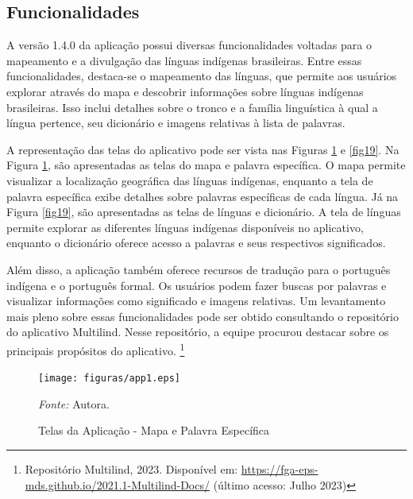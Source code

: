 \subsection{Funcionalidades}
\label{Funcionalidades}
A versão 1.4.0 da aplicação possui diversas funcionalidades voltadas para o mapeamento e a divulgação das línguas indígenas brasileiras. Entre essas funcionalidades, destaca-se o mapeamento das línguas, que permite aos usuários 
explorar através do mapa e descobrir informações sobre línguas indígenas brasileiras. Isso inclui detalhes sobre o tronco e a família linguística à qual a língua pertence, seu dicionário e imagens relativas à lista de palavras.


A representação das telas do aplicativo pode ser vista nas Figuras \ref{fig18} e \ref{fig19}. Na Figura \ref{fig18}, são apresentadas as telas do mapa e palavra específica. O mapa permite visualizar a localização geográfica das 
línguas indígenas, enquanto a tela de palavra específica exibe detalhes sobre palavras específicas de cada língua. Já na Figura \ref{fig19}, são apresentadas as telas de línguas e dicionário. A tela de línguas permite explorar 
as diferentes línguas indígenas disponíveis no aplicativo, enquanto o dicionário oferece acesso a palavras e seus respectivos significados. 

Além disso, a aplicação também oferece recursos de tradução para o português indígena e o português formal. Os usuários podem fazer buscas por palavras e visualizar informações como significado e imagens relativas. Um levantamento 
mais pleno sobre essas funcionalidades pode ser obtido consultando o repositório do aplicativo Multilind. Nesse repositório, a equipe procurou destacar sobre os principais propósitos do aplicativo. \footnote{Repositório Multilind, 2023. Disponível
em: \url{https://fga-eps-mds.github.io/2021.1-Multilind-Docs/} (último acesso: Julho 2023)}

\begin{figure}[h!]
	\centering
	\caption{Telas da Aplicação - Mapa e Palavra Específica}
	\begin{adjustbox}{center}
		\texttt{[image: figuras/app1.eps]}
	\end{adjustbox}
	\begin{tablenotes}[flushleft]
		\centering
		\item \textit{Fonte:} Autora.
	\end{tablenotes}
	\label{fig18}
\end{figure}

\newpage

